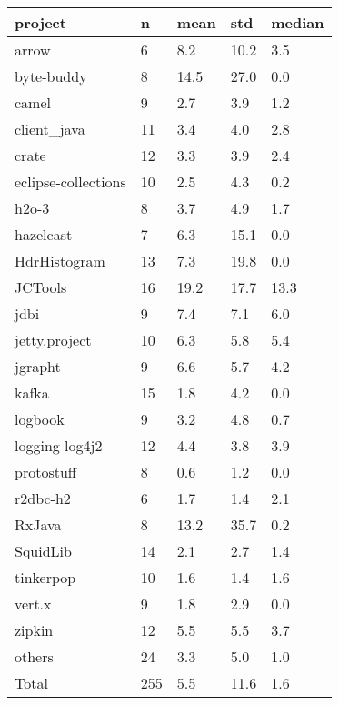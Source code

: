 \begin{tabular}{lllll}
\toprule
            project &   n & mean &  std & median \\
\midrule
              arrow &   6 &  8.2 & 10.2 &    3.5 \\
         byte-buddy &   8 & 14.5 & 27.0 &    0.0 \\
              camel &   9 &  2.7 &  3.9 &    1.2 \\
        client\_java &  11 &  3.4 &  4.0 &    2.8 \\
              crate &  12 &  3.3 &  3.9 &    2.4 \\
eclipse-collections &  10 &  2.5 &  4.3 &    0.2 \\
              h2o-3 &   8 &  3.7 &  4.9 &    1.7 \\
          hazelcast &   7 &  6.3 & 15.1 &    0.0 \\
       HdrHistogram &  13 &  7.3 & 19.8 &    0.0 \\
            JCTools &  16 & 19.2 & 17.7 &   13.3 \\
               jdbi &   9 &  7.4 &  7.1 &    6.0 \\
      jetty.project &  10 &  6.3 &  5.8 &    5.4 \\
            jgrapht &   9 &  6.6 &  5.7 &    4.2 \\
              kafka &  15 &  1.8 &  4.2 &    0.0 \\
            logbook &   9 &  3.2 &  4.8 &    0.7 \\
     logging-log4j2 &  12 &  4.4 &  3.8 &    3.9 \\
         protostuff &   8 &  0.6 &  1.2 &    0.0 \\
           r2dbc-h2 &   6 &  1.7 &  1.4 &    2.1 \\
             RxJava &   8 & 13.2 & 35.7 &    0.2 \\
           SquidLib &  14 &  2.1 &  2.7 &    1.4 \\
          tinkerpop &  10 &  1.6 &  1.4 &    1.6 \\
             vert.x &   9 &  1.8 &  2.9 &    0.0 \\
             zipkin &  12 &  5.5 &  5.5 &    3.7 \\
             others &  24 &  3.3 &  5.0 &    1.0 \\
              Total & 255 &  5.5 & 11.6 &    1.6 \\
\bottomrule
\end{tabular}
